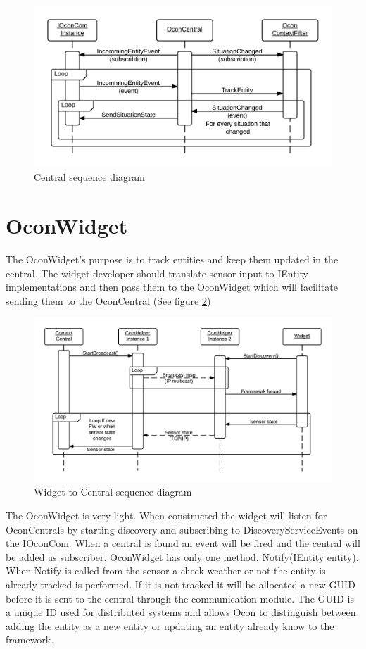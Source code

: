 \documentclass[../report.tex]{subfiles}
\begin{document}
\begin{figure}
\centering
\includegraphics[scale=0.2]{sequencediagram-central.png}
\caption{Central sequence diagram}
\label{fig:seqcentral}
\end{figure}

\section{OconWidget}
\label{sec:OconWidget}

The OconWidget's purpose is to track entities and keep them updated in the central. The widget developer should translate sensor input to IEntity implementations and then pass them to the OconWidget which will facilitate sending them to the OconCentral (See figure \ref{fig:widgetComHelper})

\begin{figure}[H]
\hspace{-35px}
\includegraphics[width=500px]{comHelperSequence-widget.png}
\caption{Widget to Central sequence diagram}
\label{fig:widgetComHelper}
\end{figure}

The OconWidget is very light. When constructed the widget will listen for OconCentrals by starting discovery and subscribing to DiscoveryServiceEvents on the IOconCom. When a central is found an event will be fired and the central will be added as subscriber. OconWidget has only one method. Notify(IEntity entity). When Notify is called from the sensor a check weather or not the entity is already tracked is performed. If it is not tracked it will be allocated a new GUID before it is sent to the central through the communication module. The GUID is a unique ID used for distributed systems and allows Ocon to distinguish between adding the entity as a new entity or updating an entity already know to the framework.
\end{document}

